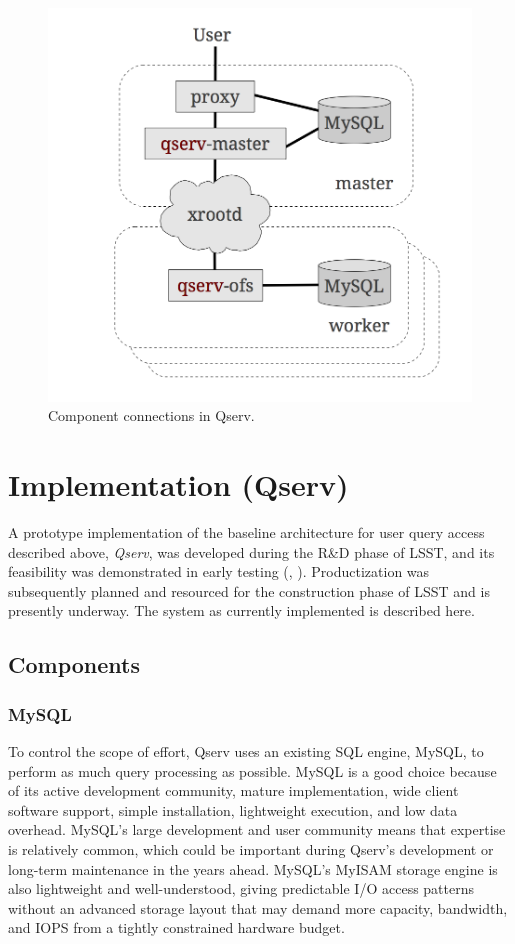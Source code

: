 \documentclass[DM,lsstdraft,toc]{lsstdoc}
\begin{document}
\begin{figure}[H]
\centering
\includegraphics{_static/qserve_components.png}
\caption{Component connections in Qserv.}
\end{figure}

\section{Implementation (Qserv)}\label{implementation}

A prototype implementation of the baseline architecture for user query
access described above, \emph{Qserv}, was developed during the R\&D phase of
LSST, and its feasibility was demonstrated in early testing (,
). Productization was subsequently planned and resourced for
the construction phase of LSST and is presently underway.  The system as
currently implemented is described here.

\subsection{Components}\label{components}

\subsubsection{MySQL}\label{mysql}

To control the scope of effort, Qserv uses an existing SQL engine, MySQL, to
perform as much query processing as possible. MySQL is a good choice because
of its active development community, mature implementation, wide client
software support, simple installation, lightweight execution, and low data
overhead. MySQL's large development and user community means that expertise is
relatively common, which could be important during Qserv's development or
long-term maintenance in the years ahead. MySQL's MyISAM storage engine is
also lightweight and well-understood, giving predictable I/O access patterns
without an advanced storage layout that may demand more capacity, bandwidth,
and IOPS from a tightly constrained hardware budget.
\end{document}
